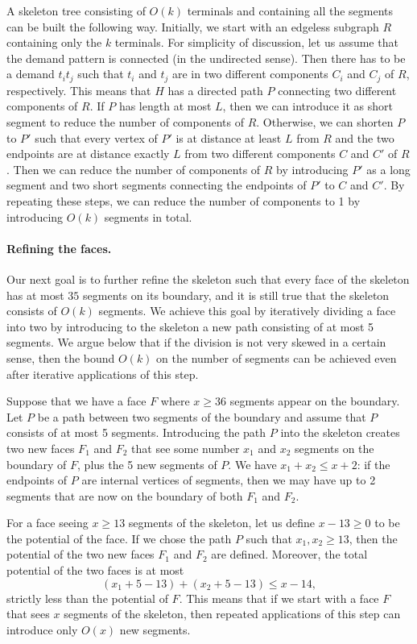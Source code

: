 \documentclass[a4paper,11pt]{article}
\theoremstyle{plain}
\newtheorem{identification rule}{Identification Rule}
\theoremstyle{definition}
\theoremstyle{remark}
\begin{document}
  A skeleton tree consisting of $O(k)$ terminals and containing all the segments can be built the following way. Initially, we start with an edgeless subgraph $R$ containing only the $k$ terminals. For simplicity of discussion, let us assume that the demand pattern is connected (in the undirected sense). Then there has to be a demand $t_it_j$ such that $t_i$ and $t_j$ are in two different components $C_i$ and $C_j$ of $R$, respectively. This means that $H$ has a directed path $P$ connecting two different components of $R$. If $P$ has length at most $L$, then we can introduce it as short segment to reduce the number of components of $R$. Otherwise, we can shorten $P$ to $P'$ such that every vertex of $P'$ is at distance at least $L$ from $R$ and the two endpoints are at distance exactly $L$ from two different components $C$ and $C'$ of $R$. Then we can reduce the number of components of $R$ by introducing $P'$ as a long segment and two short segments connecting the endpoints of $P'$ to $C$ and $C'$. By repeating these steps, we can reduce the number of components to 1 by introducing $O(k)$ segments in total.  

  \paragraph{Refining the faces.} Our next goal is to further refine the skeleton such that every face of the skeleton has at most $35$ segments on its boundary, and it is still true that the skeleton consists of $O(k)$ segments. We achieve this goal by iteratively dividing a face into two by introducing to the skeleton a new path consisting of at most 5 segments. We argue below that if the division is not very skewed in a certain sense, then the bound $O(k)$ on the number of segments can be achieved even after iterative applications of this step.

Suppose that we have a face $F$ where $x\ge 36$ segments appear on the boundary. Let $P$ be a path between two segments of the boundary and assume that $P$ consists of at most 5 segments. Introducing the path $P$ into the skeleton creates two new faces $F_1$ and $F_2$ that see some number $x_1$ and $x_2$ segments on the boundary of $F$, plus the 5 new segments of $P$. We have $x_1+x_2\le x+2$: if the endpoints of $P$ are internal vertices of segments, then we may have up to 2 segments that are now on the boundary of both $F_1$ and $F_2$.

For a face seeing $x\ge 13$ segments of the skeleton, let us define $x-13\ge 0$ to be the potential of the face. If we chose the path $P$ such that $x_1,x_2\ge 13$, then the potential of the two new faces $F_1$ and $F_2$ are defined. Moreover, the total potential of the two faces is at most
\[
  (x_1+5-13)+(x_2+5-13)\le x-14,
\]
strictly less than the potential of $F$. This means that if we start with a face $F$ that sees $x$ segments of the skeleton, then repeated applications of this step can introduce only $O(x)$ new segments.
\end{document}
